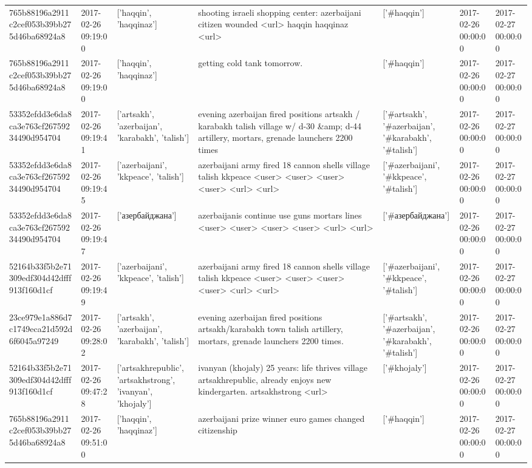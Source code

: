 \begin{tabular}{lllllll}
765b88196a2911c2cef053b39bb275d46ba68924a8 & 2017-02-26 09:19:00 & ['haqqin', 'haqqinaz'] & shooting israeli shopping center: azerbaijani citizen wounded <url> haqqin haqqinaz <url> & ['#haqqin'] & 2017-02-26 00:00:00 & 2017-02-27 00:00:00 \\
765b88196a2911c2cef053b39bb275d46ba68924a8 & 2017-02-26 09:19:00 & ['haqqin', 'haqqinaz'] & getting cold tank tomorrow. & ['#haqqin'] & 2017-02-26 00:00:00 & 2017-02-27 00:00:00 \\
53352efdd3e6da8ca3e763cf26759234490d954704 & 2017-02-26 09:19:41 & ['artsakh', 'azerbaijan', 'karabakh', 'talish'] & evening azerbaijan fired positions artsakh / karabakh talish village w/ d-30 \&amp; d-44 artillery, mortars, grenade launchers 2200 times & ['#artsakh', '#azerbaijan', '#karabakh', '#talish'] & 2017-02-26 00:00:00 & 2017-02-27 00:00:00 \\
53352efdd3e6da8ca3e763cf26759234490d954704 & 2017-02-26 09:19:45 & ['azerbaijani', 'kkpeace', 'talish'] & azerbaijani army fired 18 cannon shells village talish kkpeace <user> <user> <user> <user> <url> <url> & ['#azerbaijani', '#kkpeace', '#talish'] & 2017-02-26 00:00:00 & 2017-02-27 00:00:00 \\
53352efdd3e6da8ca3e763cf26759234490d954704 & 2017-02-26 09:19:47 & ['азербайджана'] & azerbaijanis continue use guns mortars lines <user> <user> <user> <user> <url> <url> & ['#азербайджана'] & 2017-02-26 00:00:00 & 2017-02-27 00:00:00 \\
52164b33f5b2e71309edf304d42dfff913f160d1cf & 2017-02-26 09:19:49 & ['azerbaijani', 'kkpeace', 'talish'] & azerbaijani army fired 18 cannon shells village talish kkpeace <user> <user> <user> <user> <url> <url> & ['#azerbaijani', '#kkpeace', '#talish'] & 2017-02-26 00:00:00 & 2017-02-27 00:00:00 \\
23ce979e1a886d7c1749eca21d592d6f6045a97249 & 2017-02-26 09:28:02 & ['artsakh', 'azerbaijan', 'karabakh', 'talish'] & evening azerbaijan fired positions artsakh/karabakh town talish artillery, mortars, grenade launchers 2200 times. & ['#artsakh', '#azerbaijan', '#karabakh', '#talish'] & 2017-02-26 00:00:00 & 2017-02-27 00:00:00 \\
52164b33f5b2e71309edf304d42dfff913f160d1cf & 2017-02-26 09:47:28 & ['artsakhrepublic', 'artsakhstrong', 'ivanyan', 'khojaly'] & ivanyan (khojaly) 25 years: life thrives village artsakhrepublic, already enjoys new kindergarten. artsakhstrong <url> & ['#khojaly'] & 2017-02-26 00:00:00 & 2017-02-27 00:00:00 \\
765b88196a2911c2cef053b39bb275d46ba68924a8 & 2017-02-26 09:51:00 & ['haqqin', 'haqqinaz'] & azerbaijani prize winner euro games changed citizenship & ['#haqqin'] & 2017-02-26 00:00:00 & 2017-02-27 00:00:00 \\

\end{tabular}
